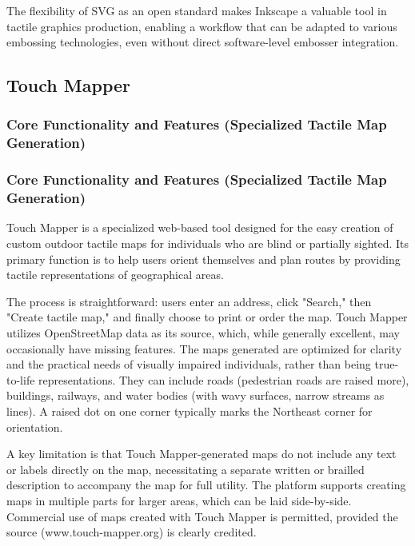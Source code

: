 The flexibility of SVG as an open standard makes Inkscape a valuable tool in tactile graphics production, enabling a workflow that can be adapted to various embossing technologies, even without direct software-level embosser integration. \cite{ProBlindCreate}

\subsection{Touch Mapper}

\subsubsection{Core Functionality and Features (Specialized Tactile Map Generation)}

\subsubsection{Core Functionality and Features (Specialized Tactile Map Generation)}

Touch Mapper is a specialized web-based tool designed for the easy creation of custom outdoor tactile maps for individuals who are blind or partially sighted. \cite{AELData,NYUWorkflow,Ability2AccessTSS} Its primary function is to help users orient themselves and plan routes by providing tactile representations of geographical areas. \cite{AELData,NYUWorkflow}

The process is straightforward: users enter an address, click "Search," then "Create tactile map," and finally choose to print or order the map. \cite{NYUWorkflow} Touch Mapper utilizes OpenStreetMap data as its source, which, while generally excellent, may occasionally have missing features. \cite{AELData} The maps generated are optimized for clarity and the practical needs of visually impaired individuals, rather than being true-to-life representations. \cite{AELData} They can include roads (pedestrian roads are raised more), buildings, railways, and water bodies (with wavy surfaces, narrow streams as lines). \cite{AELData} A raised dot on one corner typically marks the Northeast corner for orientation. \cite{AELData,Ability2AccessTSS}

A key limitation is that Touch Mapper-generated maps do not include any text or labels directly on the map, necessitating a separate written or brailled description to accompany the map for full utility. \cite{AELData,Ability2AccessTSS} The platform supports creating maps in multiple parts for larger areas, which can be laid side-by-side. \cite{AELData} Commercial use of maps created with Touch Mapper is permitted, provided the source (www.touch-mapper.org) is clearly credited. \cite{AELData}

